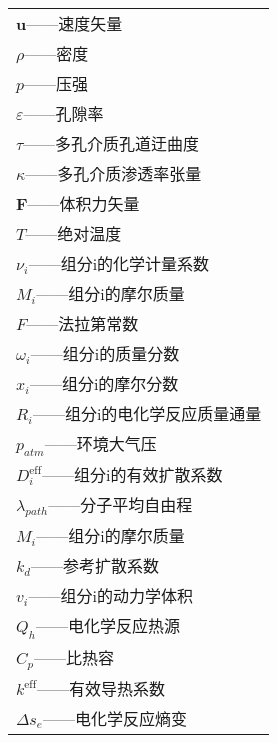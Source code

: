 
\label{chap:symbol}
\begin{tabular}{l}
	$\textbf{u}$——速度矢量\\
	$\rho$——密度\\
	$p$——压强\\
	$\varepsilon$——孔隙率\\
	$\tau$——多孔介质孔道迂曲度\\
	$\kappa$——多孔介质渗透率张量\\
	$\textbf{F}$——体积力矢量\\
	$T$——绝对温度\\
	$\nu_i$——组分i的化学计量系数\\
	$M_i$——组分i的摩尔质量\\
	$F$——法拉第常数\\
	$\omega_i$——组分i的质量分数\\
	$x_i$——组分i的摩尔分数\\
	$R_i$——组分i的电化学反应质量通量\\
	$p_{atm}$——环境大气压\\
	$D_i^{\mathrm{eff}}$——组分i的有效扩散系数\\
	$\lambda_{path}$——分子平均自由程\\
	$M_i$——组分i的摩尔质量\\
	$k_d$——参考扩散系数\\
	$v_i$——组分i的动力学体积\\
	$Q_h$——电化学反应热源\\
	$C_p$——比热容\\
	$k^{\mathrm{eff}}$——有效导热系数\\
	$\Delta s_e$——电化学反应熵变\\
\end{tabular}

